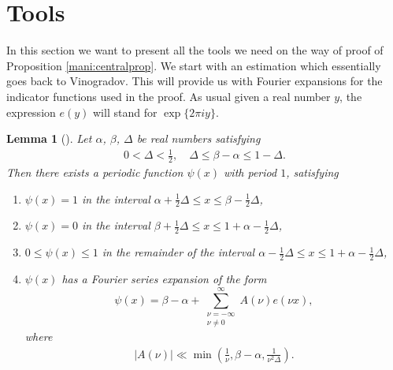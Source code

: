 \documentclass[a4paper,10pt]{amsart}
\newtheorem{lem}{Lemma}[section]
\numberwithin{equation}{section}
\theoremstyle{definition}
\theoremstyle{remark}
\renewcommand{\lvert}{\left\vert}
\renewcommand{\rvert}{\right\vert}
\begin{document}

\section{Tools}\label{sec:tools}

In this section we want to present all the tools we need on the way of proof of
Proposition \ref{mani:centralprop}. We start with an estimation which essentially goes
back to Vinogradov. This will provide us with Fourier expansions for the
indicator functions used in the proof. As usual given a real number
$y$, the expression $e(y)$ will stand for $\exp\{2\pi i y\}$.

\begin{lem}[{\cite[Lemma
    12]{vinogradov2004:method_trigonometrical_sums}}]\label{vin:lem12}
Let $\alpha$, $\beta$, $\Delta$ be real numbers satisfying
\begin{gather*}
0<\Delta<\frac12,\quad\Delta\leq\beta-\alpha\leq1-\Delta.
\end{gather*}
Then there exists a periodic function $\psi(x)$ with period $1$,
satisfying
\begin{enumerate}
\item $\psi(x)=1$ in the interval $\alpha+\frac12\Delta\leq x
  \leq\beta-\frac12\Delta$,
\item $\psi(x)=0$ in the interval $\beta+\frac12\Delta\leq x
  \leq1+\alpha-\frac12\Delta$,
\item $0\leq\psi(x)\leq1$ in the remainder of the interval
  $\alpha-\frac12\Delta\leq x\leq1+\alpha-\frac12\Delta$,
\item $\psi(x)$ has a Fourier series expansion of the form
  $$
  \psi(x)=\beta-\alpha+\sum_{\substack{\nu=-\infty\\\nu\neq0}}^\infty
   A(\nu) e(\nu x),
  $$
  where
  \begin{gather}\label{mani:A}
  \lvert A(\nu)\rvert \ll \min \left( \frac 1\nu,
  \beta-\alpha,\frac{1}{\nu^2\Delta} \right).
  \end{gather}
\end{enumerate}
\end{lem}
\end{document}
